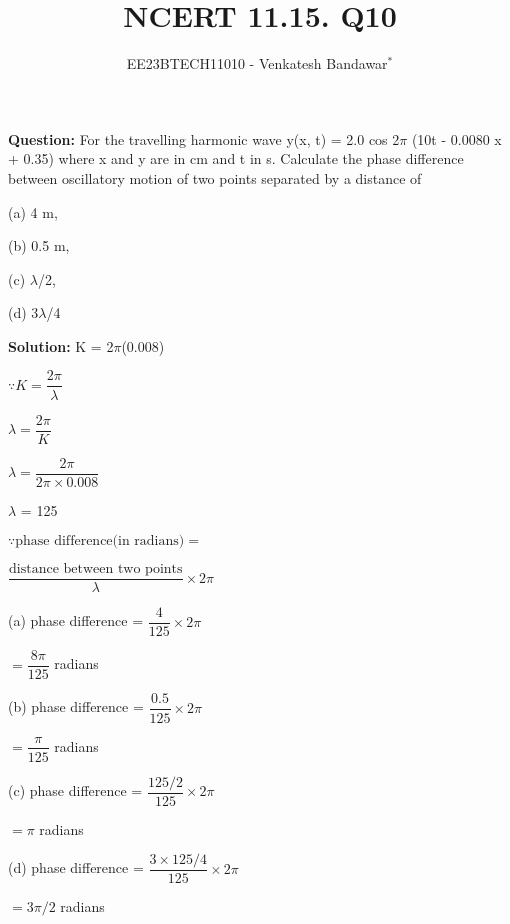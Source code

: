 \documentclass[journal,12pt,twocolumn]{IEEEtran}
\theoremstyle{remark}
\begin{document}

\vspace{3cm}

\title{NCERT 11.15. Q10}
\author{EE23BTECH11010 - Venkatesh Bandawar$^{*}$%
}
\maketitle
\newpage
\bigskip

\renewcommand{\thefigure}{\theenumi}
\renewcommand{\thetable}{\theenumi}




\textbf{Question:} For the travelling harmonic wave
y(x, t) = 2.0 cos 2$\pi$ (10t - 0.0080 x + 0.35) where x and y are in cm and t in s. Calculate the phase difference between oscillatory
motion of two points separated by a distance of 

(a) 4 m,

(b) 0.5 m,

(c) $\lambda$/2,

(d) 3$\lambda$/4

\textbf{Solution:} K = 2$\pi$(0.008)

$\because K = \dfrac{2\pi}{\lambda}$

$\lambda = \dfrac{2\pi}{K}$

\vspace{0.2cm}

$\lambda = \dfrac{2\pi}{2 \pi \times 0.008}$

\vspace{0.2cm}

$\lambda$ = 125

\vspace{0.2cm}

$\because \text{phase difference(in radians)} =$

\vspace{0.2cm}

$\dfrac{\text{distance between two points}}{\lambda} \times 2\pi$

(a) phase difference = $\dfrac{4}{125} \times 2\pi$

\begin{center}
$ = \dfrac{8\pi}{125}$ radians
\end{center}

(b) phase difference = $\dfrac{0.5}{125} \times 2\pi$

\begin{center}
$ = \dfrac{\pi}{125}$ radians
\end{center}

(c) phase difference = $\dfrac{125/2}{125} \times 2\pi$

\begin{center}
$ = \pi$ radians
\end{center}

(d) phase difference = $\dfrac{3 \times 125/4}{125} \times 2\pi$

\begin{center}
$ = 3\pi /2$ radians
\end{center}
\end{document}
